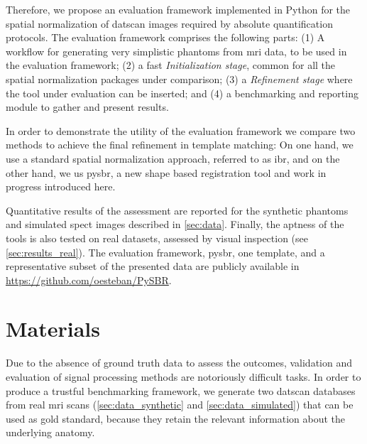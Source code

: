 \documentclass{frontiers}
\begin{document}
Therefore, we propose an evaluation framework implemented in Python for the
  spatial normalization of \gls*{datscan} images required by absolute quantification
  protocols.
The evaluation framework comprises the following parts: 
(1) A workflow for generating very simplistic phantoms from
   \gls*{mri} data, to be used in the evaluation framework;
(2) a fast \emph{Initialization stage}, common for all the spatial
    normalization packages under comparison;
(3) a \emph{Refinement stage} where the tool under evaluation can be inserted; and
(4) a benchmarking and reporting module to gather and present results.

In order to demonstrate the utility of the evaluation framework we compare 
  two methods to achieve the final refinement in template matching: 
On one hand, we use a standard spatial normalization 
  approach,  referred to as \gls*{ibr}, 
  and on the other hand, we us \gls*{pysbr}, a new shape based registration tool and 
  work in progress introduced here.   

Quantitative results of the assessment are reported for the synthetic
  phantoms and simulated \gls*{spect} images described in \autoref{sec:data}.
Finally, the aptness of the tools is also tested on real datasets,
  assessed by visual inspection (see \autoref{sec:results_real}).
The evaluation framework, \gls*{pysbr}, one template,
  and a representative subset of the presented data are publicly 
  available in \url{https://github.com/oesteban/PySBR}.

\section{Materials}\label{sec:data}

Due to the absence of ground truth data to assess the outcomes, validation and evaluation 
  of signal processing methods are notoriously difficult tasks.
In order to produce a trustful benchmarking framework, we generate two 
  \gls*{datscan} databases from real \gls*{mri} scans (\autoref{sec:data_synthetic}
  and \autoref{sec:data_simulated}) that can be used as gold standard, 
  because they retain the relevant information about the underlying anatomy.
 
\end{document}
